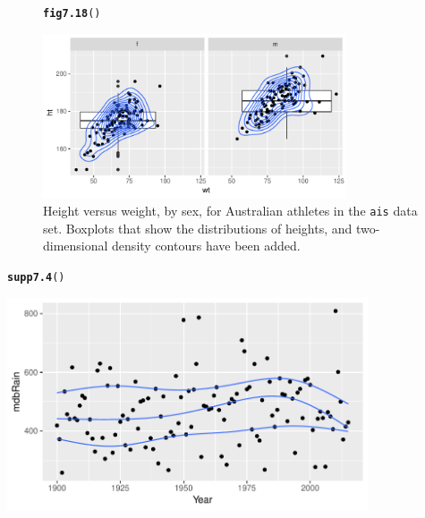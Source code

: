 \documentclass[12pt, a4paper,  BCOR=8.25mm, DIV=15]{scrartcl}\usepackage[]{graphicx}\usepackage[]{color}
\makeatletter
\newcommand{\hlstd}[1]{\textcolor[rgb]{0.345,0.345,0.345}{#1}}%
\newcommand{\hlkwd}[1]{\textcolor[rgb]{0.737,0.353,0.396}{\textbf{#1}}}%
\newenvironment{kframe}{%
 \def\at@end@of@kframe{}%
 \ifinner\ifhmode%
  \def\at@end@of@kframe{\end{minipage}}%
  \begin{minipage}{\columnwidth}%
 \fi\fi%
 \def\FrameCommand##1{\hskip\@totalleftmargin \hskip-\fboxsep
 \colorbox{shadecolor}{##1}\hskip-\fboxsep
     \hskip-\linewidth \hskip-\@totalleftmargin \hskip\columnwidth}%
 \MakeFramed {\advance\hsize-\width
   \@totalleftmargin\z@ \linewidth\hsize
   \@setminipage}}%
 {\par\unskip\endMakeFramed%
 \at@end@of@kframe}
\newenvironment{knitrout}{}{} %
\makeatother
\begin{document}
\begin{figure}[ht]
\begin{knitrout}
\color{fgcolor}\begin{kframe}
\begin{alltt}
\hlkwd{fig7.18}\hlstd{()}
\end{alltt}
\end{kframe}

{\centering \includegraphics[width=0.8\textwidth]{figure/gph-fig7_18e-1} 

}



\end{knitrout}
\caption{Height versus weight, by sex, for Australian athletes in the
\texttt{ais} data set. Boxplots that show the distributions of heights,
and two-dimensional density contours have been
added.\label{fig:ggais}}

\end{figure}

\begin{suppfigure}
\begin{knitrout}
\color{fgcolor}\begin{kframe}
\begin{alltt}
\hlkwd{supp7.4}\hlstd{()}
\end{alltt}
\end{kframe}

{\centering \includegraphics[width=0.8\textwidth]{figure/gph-supp7_4e-1} 

}



\end{knitrout}
\caption{Annual rainfall, from 1901 to 2012, for the Murray-Darling
  basin region of Australia.  Curves that estimate the 20\%, 50\% and 80\%
  quantiles have been fitted.\label{fig:ggrainpc}}
\end{suppfigure}
\end{document}
